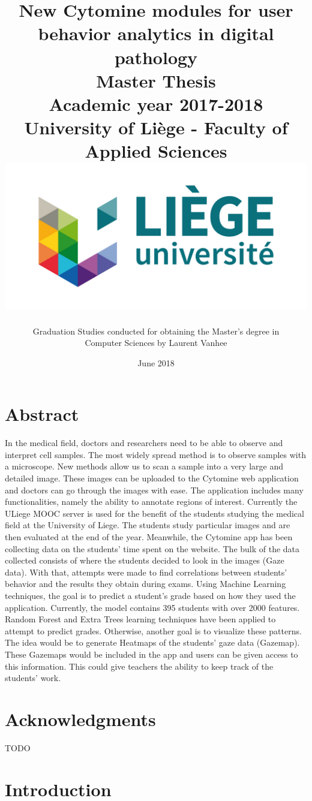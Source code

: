 \documentclass[a4paper,11pt]{report}
\title{
\LARGE
\textbf{New Cytomine modules for user behavior analytics in digital pathology}\\
\vspace{1cm}
Master Thesis\\
\vspace{0.3cm}
Academic year 2017-2018\\
University of Li\`{e}ge - Faculty of Applied Sciences\\
\vspace{3cm}
\includegraphics[scale=0.75]{images/logo.jpg}
\vspace{2cm}
}
\author{ Graduation Studies conducted for obtaining the Master's degree in \\Computer Sciences by Laurent Vanhee}
\date{June 2018}
\numberwithin{figure}{section} %
\begin{document}
\pagestyle{empty}
\maketitle

\tableofcontents

\pagestyle{fancy}
\fancyhf{}
\newpage
\section{Abstract}
In the medical field, doctors and researchers need to be able to observe and interpret cell samples.
The
most widely spread method is to observe samples with a microscope.
New methods allow us to scan a
sample into a very large and detailed image.
These images can be uploaded to the Cytomine web
application and doctors can go through the images with ease.
The application includes many
functionalities, namely the ability to annotate regions of interest.
Currently the ULiege MOOC server is
used for the benefit of the students studying the medical field at the University of Liege.
The students
study particular images and are then evaluated at the end of the year.
Meanwhile, the Cytomine app
has been collecting data on the students' time spent on the website.
The bulk of the data collected
consists of where the students decided to look in the images (Gaze data).
With that, attempts  were made to find correlations between students' behavior and the results they obtain during exams.
Using Machine
Learning techniques, the goal is to predict a student's grade based on how they used the application.
Currently, the model contains 395 students with over 2000 features.
Random Forest and Extra Trees
learning techniques have been applied to attempt to predict grades.
Otherwise, another goal is to
visualize these patterns.
The idea would be to generate Heatmaps of the students' gaze data (Gazemap).
These Gazemaps would be included in the app and users can be given access to this information.
This
could give teachers the ability to keep track of the students' work.

\section{Acknowledgments}
    {\color{red} TODO}

\section{Introduction}
\end{document}
